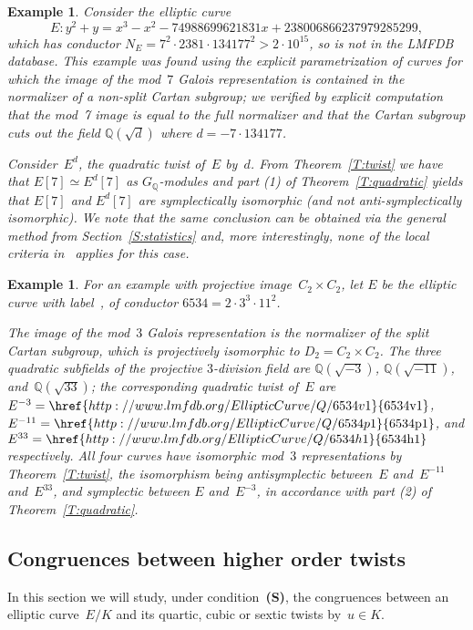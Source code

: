 \documentclass[twoside,leqno,symbols-for-thanks, draft]{rmi}
\numberwithin{equation}{section}
\newcommand{\lmfdbec}[3]{\href{http://www.lmfdb.org/EllipticCurve/Q/#1#2#3}{{\text{\rm#1#2#3}}}}
\newcommand{\Q}{\mathbb{Q}}
\newtheorem{example}[theorem]{Example}
\theoremstyle{remark}
\begin{document}
\begin{example} 
\label{Ex:LocalFail7}
Consider the elliptic curve
\[ E : y^2 + y = x^3 - x^2 - 74988699621831x +  238006866237979285299, \]
which has conductor $ N_E = 7^2 \cdot 2381 \cdot
134177^2>2\cdot10^{15}$, so is not in the LMFDB database.  This
example was found using the explicit parametrization of curves for
which the image of the mod~$7$ Galois representation is contained in
the normalizer of a non-split Cartan subgroup; we verified by explicit
computation that the mod~7 image is equal to the full normalizer and that the Cartan subgroup cuts out the field $\Q(\sqrt{d})$ where $d = -7 \cdot 134177$. 

Consider~$E^d$, the quadratic twist
of~$E$ by~$d$. 
From Theorem~\ref{T:twist} we have that $E[7] \simeq E^d[7]$ as $G_\Q$-modules and part (1) of Theorem~\ref{T:quadratic} yields that $E[7]$ and $E^d[7]$ are
symplectically isomorphic (and not anti-symplectically
isomorphic). We note that the same conclusion can be obtained via the general method from Section~\ref{S:statistics} 
and, more interestingly, none of the local criteria
in~\cite{FKSym} applies for this case.
\end{example}

\begin{example} \label{Ex:3twists}
  For an example with projective image~$C_2\times C_2$, let $E$ be the
  elliptic curve with label~\lmfdbec{6534}{a}{1}, of conductor
  $6534=2\cdot3^3\cdot11^2$.  

  The image of the mod~$3$ Galois representation is the normalizer of
  the split Cartan subgroup, which
  is projectively isomorphic to $D_2 = C_2\times C_2$.  The three quadratic
  subfields of the projective $3$-division field are $\Q(\sqrt{-3})$,
  $\Q(\sqrt{-11})$, and~$\Q(\sqrt{33})$; the corresponding quadratic
  twist of~$E$ are $E^{-3}=\lmfdbec{6534}{v}{1}$,
  $E^{-11}=\lmfdbec{6534}{p}{1}$, and $E^{33}=\lmfdbec{6534}{h}{1}$
  respectively.  All four curves have isomorphic mod~$3$
  representations by Theorem~\ref{T:twist}, the isomorphism being antisymplectic between~$E$
  and~$E^{-11}$ and~$E^{33}$, and symplectic between $E$ and~$E^{-3}$,
  in accordance with part (2) of
  Theorem~\ref{T:quadratic}.
\end{example}


\subsection{Congruences between higher order twists} \label{SS:higherCong}
In this section we will study, under condition~{\bf (S)}, the congruences between an elliptic curve~$E/K$ and its quartic, cubic or sextic twists by~$u \in K$.
\end{document}

